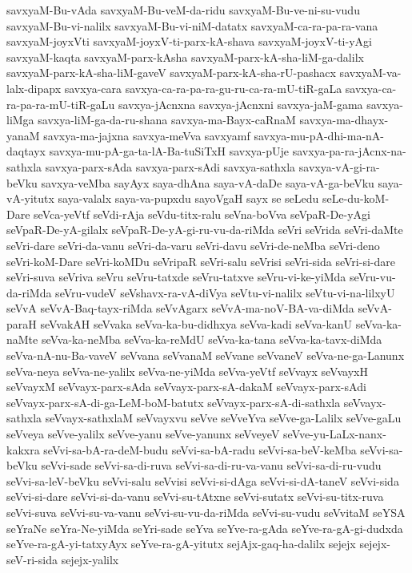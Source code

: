 {savxyaM-Bu-vAda
savxyaM-Bu-veM-da-ridu
savxyaM-Bu-ve-ni-su-vudu
savxyaM-Bu-vi-nalilx
savxyaM-Bu-vi-niM-datatx
savxyaM-ca-ra-pa-ra-vana
savxyaM-joyxVti
savxyaM-joyxV-ti-parx-kA-shava
savxyaM-joyxV-ti-yAgi
savxyaM-kaqta
savxyaM-parx-kAsha
savxyaM-parx-kA-sha-liM-ga-dalilx
savxyaM-parx-kA-sha-liM-gaveV
savxyaM-parx-kA-sha-rU-pashacx
savxyaM-va-lalx-dipapx
savxya-cara
savxya-ca-ra-pa-ra-gu-ru-ca-ra-mU-tiR-gaLa
savxya-ca-ra-pa-ra-mU-tiR-gaLu
savxya-jAcnxna
savxya-jAcnxni
savxya-jaM-gama
savxya-liMga
savxya-liM-ga-da-ru-shana
savxya-ma-Bayx-caRnaM
savxya-ma-dhayx-yanaM
savxya-ma-jajxna
savxya-meVva
savxyamf
savxya-mu-pA-dhi-ma-nA-daqtayx
savxya-mu-pA-ga-ta-lA-Ba-tuSiTxH
savxya-pUje
savxya-pa-ra-jAcnx-na-sathxla
savxya-parx-sAda
savxya-parx-sAdi
savxya-sathxla
savxya-vA-gi-ra-beVku
savxya-veMba
sayAyx
saya-dhAna
saya-vA-daDe
saya-vA-ga-beVku
saya-vA-yitutx
saya-valalx
saya-va-pupxdu
sayoVgaH
sayx
se
seLedu
seLe-du-koM-Dare
seVca-yeVtf
seVdi-rAja
seVdu-titx-ralu
seVna-boVva
seVpaR-De-yAgi
seVpaR-De-yA-gilalx
seVpaR-De-yA-gi-ru-vu-da-riMda
seVri
seVrida
seVri-daMte
seVri-dare
seVri-da-vanu
seVri-da-varu
seVri-davu
seVri-de-neMba
seVri-deno
seVri-koM-Dare
seVri-koMDu
seVripaR
seVri-salu
seVrisi
seVri-sida
seVri-si-dare
seVri-suva
seVriva
seVru
seVru-tatxde
seVru-tatxve
seVru-vi-ke-yiMda
seVru-vu-da-riMda
seVru-vudeV
seVshavx-ra-vA-diVya
seVtu-vi-nalilx
seVtu-vi-na-lilxyU
seVvA
seVvA-Baq-tayx-riMda
seVvAgarx
seVvA-ma-noV-BA-va-diMda
seVvA-paraH
seVvakAH
seVvaka
seVva-ka-bu-didhxya
seVva-kadi
seVva-kanU
seVva-ka-naMte
seVva-ka-neMba
seVva-ka-reMdU
seVva-ka-tana
seVva-ka-tavx-diMda
seVva-nA-nu-Ba-vaveV
seVvana
seVvanaM
seVvane
seVvaneV
seVva-ne-ga-Lanunx
seVva-neya
seVva-ne-yalilx
seVva-ne-yiMda
seVva-yeVtf
seVvayx
seVvayxH
seVvayxM
seVvayx-parx-sAda
seVvayx-parx-sA-dakaM
seVvayx-parx-sAdi
seVvayx-parx-sA-di-ga-LeM-boM-batutx
seVvayx-parx-sA-di-sathxla
seVvayx-sathxla
seVvayx-sathxlaM
seVvayxvu
seVve
seVveYva
seVve-ga-Lalilx
seVve-gaLu
seVveya
seVve-yalilx
seVve-yanu
seVve-yanunx
seVveyeV
seVve-yu-LaLx-nanx-kakxra
seVvi-sa-bA-ra-deM-budu
seVvi-sa-bA-radu
seVvi-sa-beV-keMba
seVvi-sa-beVku
seVvi-sade
seVvi-sa-di-ruva
seVvi-sa-di-ru-va-vanu
seVvi-sa-di-ru-vudu
seVvi-sa-leV-beVku
seVvi-salu
seVvisi
seVvi-si-dAga
seVvi-si-dA-taneV
seVvi-sida
seVvi-si-dare
seVvi-si-da-vanu
seVvi-su-tAtxne
seVvi-sutatx
seVvi-su-titx-ruva
seVvi-suva
seVvi-su-va-vanu
seVvi-su-vu-da-riMda
seVvi-su-vudu
seVvitaM
seYSA
seYraNe
seYra-Ne-yiMda
seYri-sade
seYva
seYve-ra-gAda
seYve-ra-gA-gi-dudxda
seYve-ra-gA-yi-tatxyAyx
seYve-ra-gA-yitutx
sejAjx-gaq-ha-dalilx
sejejx
sejejx-seV-ri-sida
sejejx-yalilx
}

